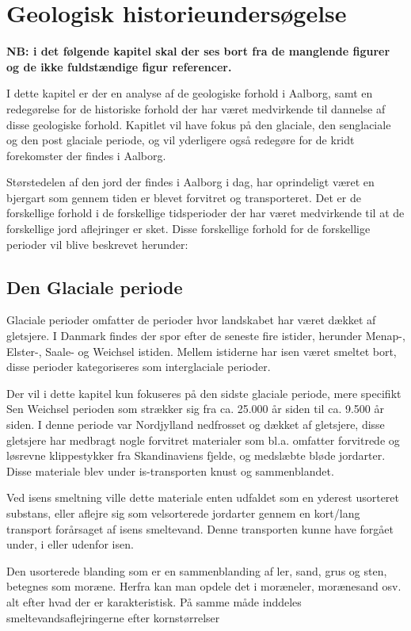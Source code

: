\chapter{Geologisk historieundersøgelse}

\textbf{NB: i det følgende kapitel skal der ses bort fra de manglende figurer og de ikke fuldstændige figur referencer.}


I dette kapitel er der en analyse af de geologiske forhold i Aalborg, samt en redegørelse for de historiske forhold der har været medvirkende til dannelse af disse geologiske forhold. 
Kapitlet vil have fokus på den glaciale, den senglaciale og den post glaciale periode, og vil yderligere også redegøre for de kridt forekomster der findes i Aalborg. 

Størstedelen af den jord der findes i Aalborg i dag, har oprindeligt været en bjergart som gennem tiden er blevet forvitret og transporteret. Det er de forskellige forhold i de forskellige tidsperioder der har været medvirkende til at de forskellige jord aflejringer er sket. Disse forskellige forhold for de forskellige perioder vil blive beskrevet herunder:

\section{Den Glaciale periode}

Glaciale perioder omfatter de perioder hvor landskabet har været dækket af gletsjere. I Danmark findes der spor efter de seneste fire istider, herunder Menap-, Elster-, Saale- og Weichsel istiden. Mellem istiderne har isen været smeltet bort, disse perioder kategoriseres som interglaciale perioder. 

Der vil i dette kapitel kun fokuseres på den sidste glaciale periode, mere specifikt Sen Weichsel perioden som strækker sig fra ca. 25.000 år siden til ca. 9.500 år siden. I denne periode var Nordjylland nedfrosset og dækket af gletsjere, disse gletsjere har medbragt nogle forvitret materialer som bl.a. omfatter forvitrede og løsrevne klippestykker fra Skandinaviens fjelde, og medslæbte bløde jordarter. Disse materiale blev under is-transporten knust og sammenblandet.

Ved isens smeltning ville dette materiale enten udfaldet som en yderest usorteret substans, eller aflejre sig som velsorterede jordarter gennem en kort/lang transport forårsaget af isens smeltevand. Denne transporten kunne have forgået under, i eller udenfor isen. 

Den usorterede blanding som er en sammenblanding af ler, sand, grus og sten, betegnes som moræne. Herfra kan man opdele det i moræneler, morænesand osv. alt efter hvad der er karakteristisk. På samme måde inddeles smeltevandsaflejringerne efter kornstørrelser

